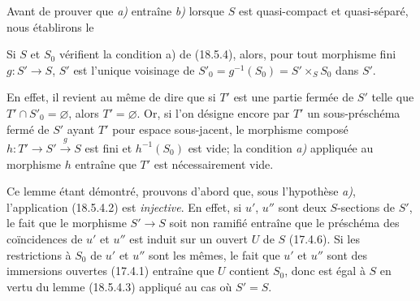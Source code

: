 Avant de prouver que \emph{a)} entraîne \emph{b)} lorsque $S$ est quasi-compact et quasi-séparé, nous établirons le

\begin{lemma}[18.5.4.3]
\label{IV.18.5.4.3}
Si $S$ et $S_0$ vérifient la condition \textup{a)} de \textup{(18.5.4)}, alors, pour tout morphisme \textup{fini} $g:S'\to S$, $S'$ est l'unique voisinage de $S'_0=g^{-1}(S_0)=S'\times_S S_0$ dans $S'$.
\end{lemma}

En effet, il revient au même de dire que si $T'$ est une partie fermée de $S'$ telle que $T'\cap S'_0=\varnothing$, alors $T'=\varnothing$. Or, si l'on désigne encore par $T'$ un sous-préschéma fermé de $S'$ ayant $T'$ pour espace sous-jacent, le morphisme composé $h:T'\to S'\xrightarrow{g}S$ est fini et $h^{-1}(S_0)$ est vide; la condition \emph{a)} appliquée au morphisme $h$ entraîne que $T'$ est nécessairement vide.

Ce lemme étant démontré, prouvons d'abord que, sous l'hypothèse \emph{a)}, l'application (18.5.4.2) est \emph{injective}. En effet, si $u'$, $u''$ sont deux $S$-sections de $S'$, le fait que le morphisme $S'\to S$ soit non ramifié entraîne que le préschéma des coïncidences de $u'$ et $u''$ est induit sur un ouvert $U$ de $S$ (17.4.6). Si les restrictions à $S_0$ de $u'$ et $u''$ sont les mêmes, le fait que $u'$ et $u''$ sont des immersions ouvertes (17.4.1) entraîne que $U$ contient $S_0$, donc est égal à $S$ en vertu du lemme (18.5.4.3) appliqué au cas où $S'=S$.

